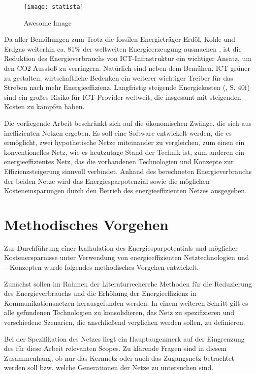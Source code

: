 \documentclass[12pt,titlepage]{article}
\begin{document}
\begin{figure}[!ht]
    \centering
    \texttt{[image: statista]}
    \caption{Awesome Image}
    \label{fig:awesome_image}
\end{figure}

Da aller Bemühungen zum Trotz die fossilen Energieträger Erdöl, Kohle und Erdgas weiterhin ca. 81\% der weltweiten Energieerzeugung ausmachen \cite{statista}, ist die Reduktion des Energieverbrauchs von ICT-Infrastruktur ein wichtiger Ansatz, um den CO2-Ausstoß zu verringern. Natürlich sind neben dem Bemühen, ICT grüner zu gestalten, wirtschaftliche Bedenken ein weiterer wichtiger Treiber für das Streben nach mehr Energieeffizienz. Langfristig steigende Energiekosten (\cite{iea2015}, S. 40f) sind ein großes Risiko für ICT-Provider weltweit, die insgesamt mit steigenden Kosten zu kämpfen haben.
 
Die vorliegende Arbeit beschränkt sich auf die ökonomischen Zwänge, die sich aus ineffizienten Netzen ergeben. Es soll eine Software entwickelt werden, die es ermöglicht, zwei hypothetische Netze miteinander zu vergleichen, zum einen ein konventionelles Netz, wie es heutzutage Stand der Technik ist, zum anderen ein energieeffizientes Netz, das die vorhandenen Technologien und Konzepte zur Effizienzsteigerung sinnvoll verbindet. Anhand des berechneten Energieverbrauchs der beiden Netze wird das Energiesparpotenzial sowie die möglichen Kosteneinsparungen durch den Betrieb des energieeffizienten Netzes ausgegeben.


\section{Methodisches Vorgehen}
Zur Durchführung einer Kalkulation des Energiesparpotentials und möglicher Kostenersparnisse unter Verwendung von energieeffizienten Netztechnologien und – Konzepten wurde folgendes methodisches Vorgehen entwickelt. 
 
Zunächst sollen im Rahmen der Literaturrecherche Methoden für die Reduzierung des Energieverbrauchs und die Erhöhung der Energieeffizienz in Kommunikationsnetzen herausgefunden werden. In einem weiteren Schritt gilt es alle gefundenen Technologien zu konsolidieren, das Netz zu spezifizieren und verschiedene Szenarien, die anschließend verglichen werden sollen, zu definieren. 
 
Bei der Spezifikation des Netzes liegt ein Hauptaugenmerk auf der Eingrenzung des für diese Arbeit relevanten Scopes. Zu klärende Fragen sind in diesem Zusammenhang, ob nur das Kernnetz oder auch das Zugangsnetz betrachtet werden soll bzw. welche Generationen der Netze zu untersuchen sind. 
 
\end{document}
